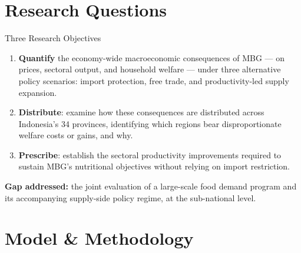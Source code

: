 \documentclass[11pt,aspectratio=169]{beamer}
\begin{document}
\section{Research Questions}

\begin{frame}{Three Research Objectives}
\footnotesize
\begin{enumerate}\setlength\itemsep{12pt}
	\item \textbf{Quantify} the economy-wide macroeconomic consequences of MBG --- on prices, sectoral output, and household welfare --- under three alternative policy scenarios: import protection, free trade, and productivity-led supply expansion.
	\item \textbf{Distribute}: examine how these consequences are distributed across Indonesia's 34 provinces, identifying which regions bear disproportionate welfare costs or gains, and why.
	\item \textbf{Prescribe}: establish the sectoral productivity improvements required to sustain MBG's nutritional objectives without relying on import restriction.
\end{enumerate}
\bigskip
{\scriptsize\textcolor{lubrown}{\textbf{Gap addressed:}} the joint evaluation of a large-scale food demand program and its accompanying supply-side policy regime, at the sub-national level.}
\end{frame}

\section{Model \& Methodology}
\end{document}
